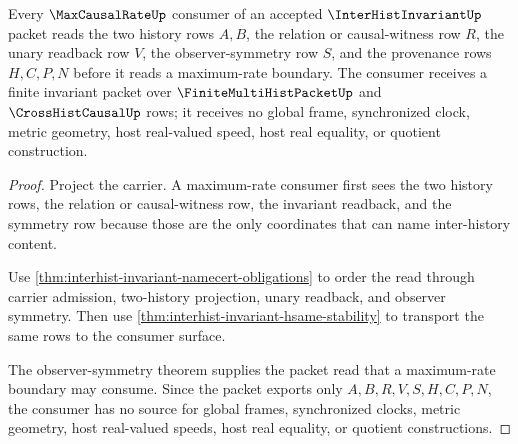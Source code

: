 \begin{theorem}
\label{thm:interhist-invariant-max-rate-consumer-boundary}
Every $\MaxCausalRateUp$ consumer of an accepted $\InterHistInvariantUp$ packet reads the two history rows $A,B$, the relation or causal-witness row $R$, the unary readback row $V$, the observer-symmetry row $S$, and the provenance rows $H,C,P,N$ before it reads a maximum-rate boundary. The consumer receives a finite invariant packet over $\FiniteMultiHistPacketUp$ and $\CrossHistCausalUp$ rows; it receives no global frame, synchronized clock, metric geometry, host real-valued speed, host real equality, or quotient construction.
\end{theorem}
\begin{proof}
Project the carrier. A maximum-rate consumer first sees the two history rows, the relation or causal-witness row, the invariant readback, and the symmetry row because those are the only coordinates that can name inter-history content.

Use \autoref{thm:interhist-invariant-namecert-obligations} to order the read through carrier admission, two-history projection, unary readback, and observer symmetry. Then use \autoref{thm:interhist-invariant-hsame-stability} to transport the same rows to the consumer surface.

The observer-symmetry theorem supplies the packet read that a maximum-rate boundary may consume. Since the packet exports only $A,B,R,V,S,H,C,P,N$, the consumer has no source for global frames, synchronized clocks, metric geometry, host real-valued speeds, host real equality, or quotient constructions.
\end{proof}

